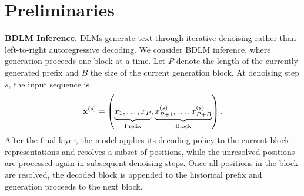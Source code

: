 





\section{Preliminaries}
\label{sec:preliminaries}

\textbf{BDLM Inference.}
DLMs generate text through iterative denoising rather than left-to-right autoregressive decoding. We consider BDLM inference, where generation proceeds one block at a time. Let $P$ denote the length of the currently generated prefix and $B$ the size of the current generation block. At denoising step $s$, the input sequence is
\begin{equation}
\mathbf{x}^{(s)}
=
\left(
\underbrace{x_1,\ldots,x_P \vphantom{x_{P+B}^{(s)}}}_{\text{Prefix}},
\underbrace{x_{P+1}^{(s)},\ldots,x_{P+B}^{(s)}}_{\text{Block}}
\right).
\label{eq:dlm_input}
\end{equation}
After the final layer, the model applies its decoding policy to the current-block representations and resolves a subset of positions, while the unresolved positions are processed again in subsequent denoising steps. Once all positions in the block are resolved, the decoded block is appended to the historical prefix and generation proceeds to the next block.

